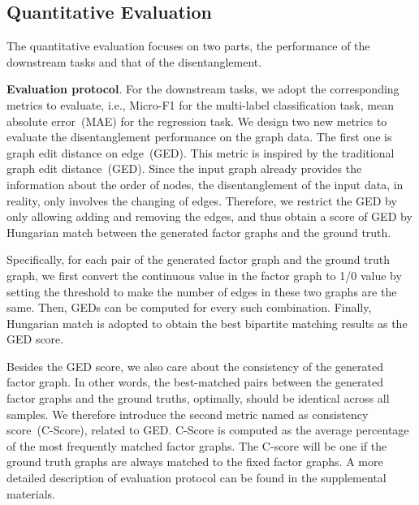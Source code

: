 \documentclass{article}
\begin{document}
\subsection{Quantitative Evaluation}
The quantitative evaluation focuses on two parts,
the performance of the downstream tasks 
and that of the disentanglement.

\textbf{Evaluation protocol}. 
For the downstream tasks, 
we adopt the corresponding metrics to evaluate,
i.e., Micro-F1 for the multi-label classification task,
mean absolute error~(MAE) for the regression task.
We design two new metrics to evaluate the disentanglement
performance on the graph data.
The first one is graph edit distance on edge~(GED).
This metric is inspired by the traditional graph edit distance~(GED).
Since the input graph already provides the information
about the order of nodes, the disentanglement of 
the input data, in reality, 
only involves the changing of edges.
Therefore, we restrict the GED by only 
allowing adding and removing the edges, and 
thus obtain a score of 
GED by Hungarian match 
between the generated factor graphs
and the ground truth.

Specifically, for each pair of the 
generated factor graph and the
ground truth graph, we first convert the continuous value in the 
factor graph to 1/0 value by setting the threshold to make
the number of edges in these two graphs are the same.
Then, GEDs can be computed for every such combination.
Finally, Hungarian match is adopted to obtain the best bipartite matching results as the GED score. 

Besides the GED score, we also
care about the consistency of the generated factor graph. 
In other words, the best-matched pairs between the generated factor graphs and the ground truths, optimally, should be 
identical across all samples.
We therefore introduce the second metric named as consistency score~(C-Score), related to GED. 
C-Score is computed as the 
average percentage of the 
most frequently matched factor graphs.
The C-score will be one 
if the ground truth graphs are always matched
to the fixed factor graphs. 
A more detailed description of evaluation
protocol can be found in the supplemental materials.
\end{document}
